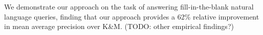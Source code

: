 \documentclass[11pt]{article}
\begin{document}
We demonstrate our approach on the task of answering fill-in-the-blank
natural language queries, finding that our approach provides a 62\%
relative improvement in mean average precision over K\&M. (TODO: other
empirical findings?)


\end{document}
